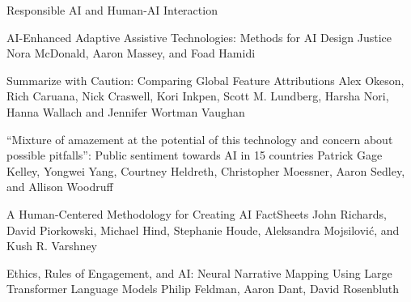 \documentclass[11pt]{article}
\begin{document}
\begin{bulletin}
\begin{articlesection}{Responsible AI and Human-AI Interaction}
%
%


\begin{article}
{AI-Enhanced Adaptive Assistive Technologies: Methods for AI Design Justice}
{Nora McDonald, Aaron Massey, and Foad Hamidi}
\graphicspath{{submissions/McDonald_final/}}

\end{article}

%
\begin{article}
{Summarize with Caution: Comparing Global Feature Attributions}
{Alex Okeson, Rich Caruana, Nick Craswell, Kori Inkpen, Scott M. Lundberg, Harsha Nori, Hanna Wallach and Jennifer Wortman Vaughan}
\graphicspath{{submissions/Wortman_final/}}

\end{article}
%
%
\begin{article}
{``Mixture of amazement at the potential of this technology and concern about possible pitfalls'': Public sentiment towards AI in 15 countries}
{Patrick Gage Kelley, Yongwei Yang, Courtney Heldreth, Christopher Moessner, Aaron Sedley, and Allison Woodruff}
\graphicspath{{submissions/Woodruff_final/}}

\end{article}
%
%
\begin{article}
{A Human-Centered Methodology for Creating AI FactSheets}
{John Richards, David Piorkowski, Michael Hind, Stephanie Houde, Aleksandra Mojsilovi\'c, and Kush R. Varshney}
\graphicspath{{submissions/Richards_final/}}

\end{article}
%
%
\begin{article}
{Ethics, Rules of Engagement, and AI: Neural Narrative Mapping Using Large Transformer Language Models}
{Philip Feldman, Aaron Dant, David Rosenbluth}
\graphicspath{{submissions/Feldman_final/}}

\end{article}


\end{articlesection}
\end{bulletin}
\end{document}

